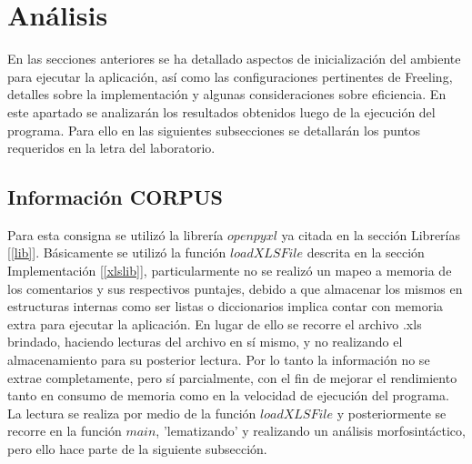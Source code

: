 \documentclass[12pt]{article}
\begin{document}
\section{Análisis}
En las secciones anteriores se ha detallado aspectos de inicialización del ambiente para ejecutar la aplicación, así como las configuraciones pertinentes de Freeling, detalles sobre la implementación y algunas consideraciones sobre eficiencia. En este apartado se analizarán los resultados obtenidos luego de la ejecución del programa. Para ello en las siguientes subsecciones se detallarán los puntos requeridos en la letra del laboratorio.


\subsection{Información CORPUS}
Para esta consigna se utilizó la librería $openpyxl$ ya citada en la sección Librerías [\ref{lib}]. Básicamente se utilizó la función $loadXLSFile$ descrita en la sección Implementación [\ref{xlslib}], particularmente no se realizó un mapeo a memoria de los comentarios y sus respectivos puntajes, debido a que almacenar los mismos en estructuras internas como ser listas o diccionarios implica contar con memoria extra para ejecutar la aplicación. En lugar de ello se recorre el archivo .xls brindado, haciendo lecturas del archivo en sí mismo, y no realizando el almacenamiento para su posterior lectura. Por lo tanto la información no se extrae completamente, pero sí parcialmente, con el fin de mejorar el rendimiento tanto en consumo de memoria como en la velocidad de ejecución del programa.
La lectura se realiza por medio de la función $loadXLSFile$ y posteriormente se recorre en la función $main$, 'lematizando' y realizando un análisis morfosintáctico, pero ello hace parte de la siguiente subsección.
\end{document}
